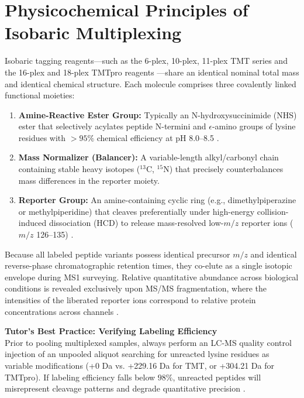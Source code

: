 \documentclass[11pt,oneside]{book}
\begin{document}
\section{Physicochemical Principles of Isobaric Multiplexing}

Isobaric tagging reagents---such as the 6-plex, 10-plex, 11-plex TMT series \cite{thompson2003tandem, werner2014high} and the 16-plex and 18-plex TMTpro reagents \cite{li2020tmtpro, thompson2020tmtpro}---share an identical nominal total mass and identical chemical structure. Each molecule comprises three covalently linked functional moieties:
\begin{enumerate}
    \item \textbf{Amine-Reactive Ester Group:} Typically an N-hydroxysuccinimide (NHS) ester that selectively acylates peptide N-termini and $\epsilon$-amino groups of lysine residues with $>95\%$ chemical efficiency at pH 8.0--8.5 \cite{mertins2018cptac}.
    \item \textbf{Mass Normalizer (Balancer):} A variable-length alkyl/carbonyl chain containing stable heavy isotopes ($^{13}\text{C}$, $^{15}\text{N}$) that precisely counterbalances mass differences in the reporter moiety.
    \item \textbf{Reporter Group:} An amine-containing cyclic ring (e.g., dimethylpiperazine or methylpiperidine) that cleaves preferentially under high-energy collision-induced dissociation (HCD) to release mass-resolved low-$m/z$ reporter ions ($m/z$ 126--135) \cite{thompson2020tmtpro}.
\end{enumerate}

Because all labeled peptide variants possess identical precursor $m/z$ and identical reverse-phase chromatographic retention times, they co-elute as a single isotopic envelope during MS1 surveying. Relative quantitative abundance across biological conditions is revealed exclusively upon MS/MS fragmentation, where the intensities of the liberated reporter ions correspond to relative protein concentrations across channels \cite{ross2004multiplexed}.

\begin{tipbox}
\textbf{Tutor's Best Practice: Verifying Labeling Efficiency}\\
Prior to pooling multiplexed samples, always perform an LC-MS quality control injection of an unpooled aliquot searching for unreacted lysine residues as variable modifications (+0 Da vs. +229.16 Da for TMT, or +304.21 Da for TMTpro). If labeling efficiency falls below $98\%$, unreacted peptides will misrepresent cleavage patterns and degrade quantitative precision \cite{mertins2018cptac}.
\end{tipbox}
\end{document}

